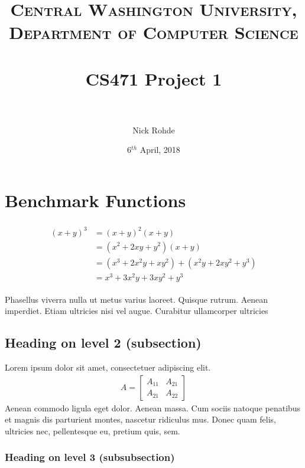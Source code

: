 \documentclass[paper=a4, fontsize=11pt]{scrartcl} %
\title{	
\normalfont \normalsize 
\textsc{Central Washington University, Department of Computer Science} \\ [25pt] %
\horrule{0.5pt} \\[0.4cm] %
\huge CS471 Project 1 \\ %
\horrule{2pt} \\[0.5cm] %
}
\author{Nick Rohde} %
\date{\normalsize 6$^{th}$ April, 2018} %
\numberwithin{equation}{section} %
\numberwithin{figure}{section} %
\numberwithin{table}{section} %
\begin{document}
\maketitle %


\section{Benchmark Functions}

\lipsum[2] %

\begin{align} 
\begin{split}
(x+y)^3 	&= (x+y)^2(x+y)\\
&=(x^2+2xy+y^2)(x+y)\\
&=(x^3+2x^2y+xy^2) + (x^2y+2xy^2+y^3)\\
&=x^3+3x^2y+3xy^2+y^3
\end{split}					
\end{align}

Phasellus viverra nulla ut metus varius laoreet. Quisque rutrum. Aenean imperdiet. Etiam ultricies nisi vel augue. Curabitur ullamcorper ultricies


\subsection{Heading on level 2 (subsection)}

Lorem ipsum dolor sit amet, consectetuer adipiscing elit. 
\begin{align}
A = 
\begin{bmatrix}
A_{11} & A_{21} \\
A_{21} & A_{22}
\end{bmatrix}
\end{align}
Aenean commodo ligula eget dolor. Aenean massa. Cum sociis natoque penatibus et magnis dis parturient montes, nascetur ridiculus mus. Donec quam felis, ultricies nec, pellentesque eu, pretium quis, sem.


\subsubsection{Heading on level 3 (subsubsection)}
\end{document}
